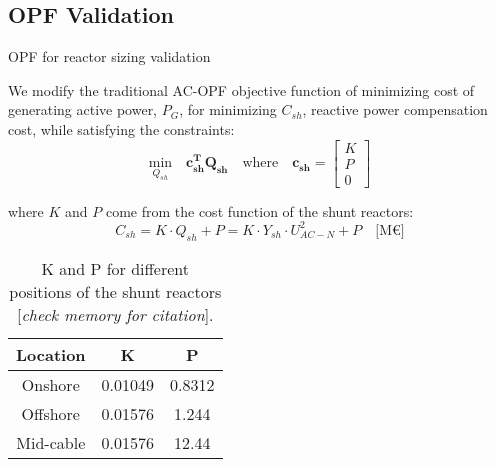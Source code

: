 \subsection{OPF Validation}
\begin{frame}{OPF for reactor sizing validation}

We modify the traditional AC-OPF objective function of minimizing cost of generating active power, $P_G$, for minimizing $C_{sh}$, reactive power compensation cost, while satisfying the constraints:
\begin{equation}\label{eq:Qopf}
    \underset{Q_{sh}}{\text{min}} \quad \mathbf{c_{sh}^T} \mathbf{Q_{sh}} \quad \text{where} \quad \mathbf{c_{sh}} = \begin{bmatrix} K \\ P \\ 0 \end{bmatrix}
    \end{equation}

where $K$ and $P$ come from the cost function of the shunt reactors:
\begin{equation}\label{eq:shuntcost}
    C_{sh}= K \cdot Q_{sh} + P = K \cdot Y_{sh}\cdot U_{AC-N}^2 + P \quad  \text{[M€]} 
\end{equation}

\begin{table}[H]
    \centering
    \begin{tabular}{c|c|c}
    \hline
    \textbf{Location} & \textbf{K} & \textbf{P} \\
    \hline
    Onshore & 0.01049 & 0.8312  \\
    Offshore & 0.01576 & 1.244 \\
    Mid-cable & 0.01576 & 12.44 \\
    \hline
    \end{tabular}
    \caption{K and P for different positions of the shunt reactors [\textit{check memory for citation}].}
    \label{tab:parametersshunt}
    \end{table}
\end{frame}





